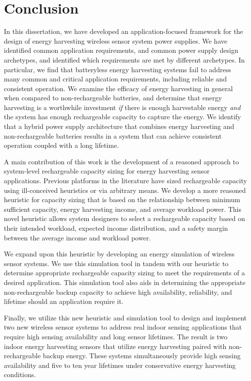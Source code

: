 \chapter{Conclusion}
\label{chap:conc}

In this dissertation, we have developed an application-focused framework for the design of energy harvesting wireless sensor system power supplies.
We have identified common application requirements, and common power supply design archetypes, and identified which requirements are met by different archetypes.
In particular, we find that batteryless energy harvesting systems fail to address many common and critical application requirements, including reliable and consistent operation.
We examine the efficacy of energy harvesting in general when compared to non-rechargeable batteries, and determine that energy harvesting is a worthwhile investment \textit{if} there is enough harvestable energy \textit{and} the system has enough rechargeable capacity to capture the energy.
We identify that a hybrid power supply architecture that combines energy harvesting and non-rechargeable batteries results in a system that can achieve consistent operation coupled with a long lifetime.

A main contribution of this work is the development of a reasoned approach to system-level rechargeable capacity sizing for energy harvesting sensor applications.
Previous platforms in the literature have sized rechargeable capacity using ill-conceived heuristics or via arbitrary means.
We develop a more reasoned heuristic for capacity sizing that is based on the relationship between minimum sufficient capacity, energy harvesting income, and average workload power. 
This novel heuristic allows system designers to select a rechargeable capacity based on their intended workload, expected income distribution, and a safety margin between the average income and workload power.

We expand upon this heuristic by developing an energy simulation of wireless sensor systems.
We use this simulation tool in tandem with our heuristic to determine appropriate rechargeable capacity sizing to meet the requirements of a desired application. 
This simulation tool also aids in determining the appropriate non-rechargeable backup capacity to achieve high availability, reliability, and lifetime should an application require it.

Finally, we utilize this new heuristic and simulation tool to design and implement two new wireless sensor systems to address real indoor sensing applications that require high sensing availability and long sensor lifetimes.
The result is two indoor energy harvesting sensors that utilize energy harvesting paired with non-rechargeable backup energy. 
These systems simultaneously provide high sensing availability and five to ten year lifetimes under conservative energy harvesting conditions.

